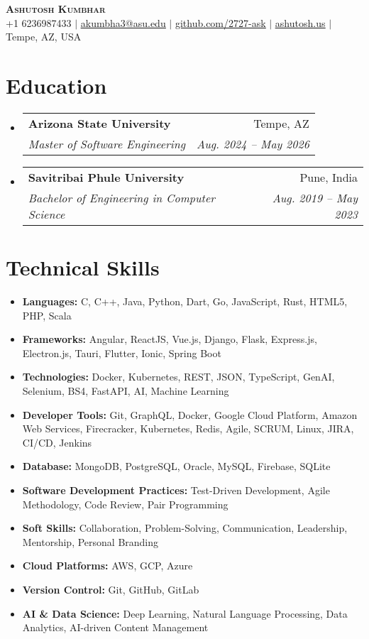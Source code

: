 \documentclass[letterpaper,11pt]{article}
\makeatletter
\newcommand{\resumeItem}[1]{
  \item\small{
    {#1 \vspace{-2pt}}
  }
}
\newcommand{\resumeSubheading}[4]{
  \vspace{-2pt}\item
    \begin{tabular*}{0.97\textwidth}[t]{l@{\extracolsep{\fill}}r}
      \textbf{#1} & #2 \\
      \textit{\small#3} & \textit{\small #4} \\
    \end{tabular*}\vspace{-7pt}
}
\newcommand{\resumeSubItem}[1]{\resumeItem{#1}\vspace{-4pt}}
\newcommand{\resumeSubHeadingListStart}{\begin{itemize}[leftmargin=0.15in, label={}]}
\newcommand{\resumeSubHeadingListEnd}{\end{itemize}}
\makeatother
\begin{document}
\begin{center}
    \textbf{\Huge \scshape Ashutosh Kumbhar} \\ \vspace{1pt}
    \small +1 6236987433 $|$ \href{mailto:akumbha3@asu.edu}{\underline{akumbha3@asu.edu}} $|$ 
    \href{https://github.com/2727-ask}{\underline{github.com/2727-ask}} $|$
    \href{https://ashutosh.us}{\underline{ashutosh.us}} $|$
    \small Tempe, AZ, USA
\end{center}


\section{Education}
  \resumeSubHeadingListStart
    \resumeSubheading
      {Arizona State University}{Tempe, AZ}
      {Master of Software Engineering}{Aug. 2024 -- May 2026}
    \resumeSubheading
      {Savitribai Phule University}{Pune, India}
      {Bachelor of Engineering in Computer Science}{Aug. 2019 -- May 2023}
  \resumeSubHeadingListEnd
  

\section{Technical Skills}
\resumeSubHeadingListStart
  \resumeSubItem{\textbf{Languages:} C, C++, Java, Python, Dart, Go, JavaScript, Rust, HTML5, PHP, Scala}
  \resumeSubItem{\textbf{Frameworks:} Angular, ReactJS, Vue.js, Django, Flask, Express.js, Electron.js, Tauri, Flutter, Ionic, Spring Boot}
  \resumeSubItem{\textbf{Technologies:} Docker, Kubernetes, REST, JSON, TypeScript, GenAI, Selenium, BS4, FastAPI, AI, Machine Learning}
  \resumeSubItem{\textbf{Developer Tools:} Git, GraphQL, Docker, Google Cloud Platform, Amazon Web Services, Firecracker, Kubernetes, Redis, Agile, SCRUM, Linux, JIRA, CI/CD, Jenkins}
  \resumeSubItem{\textbf{Database:} MongoDB, PostgreSQL, Oracle, MySQL, Firebase, SQLite}
  \resumeSubItem{\textbf{Software Development Practices:} Test-Driven Development, Agile Methodology, Code Review, Pair Programming}
  \resumeSubItem{\textbf{Soft Skills:} Collaboration, Problem-Solving, Communication, Leadership, Mentorship, Personal Branding}
  \resumeSubItem{\textbf{Cloud Platforms:} AWS, GCP, Azure}
  \resumeSubItem{\textbf{Version Control:} Git, GitHub, GitLab}
  \resumeSubItem{\textbf{AI & Data Science:} Deep Learning, Natural Language Processing, Data Analytics, AI-driven Content Management}
\resumeSubHeadingListEnd
\end{document}
